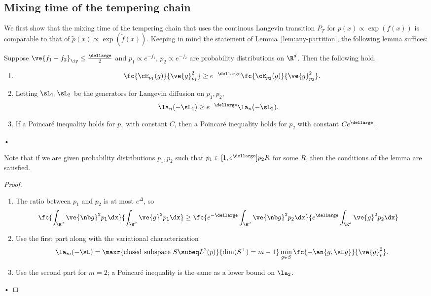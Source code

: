 \subsection{Mixing time of the tempering chain} 

We first show that the mixing time of the tempering chain that uses the continous Langevin transition $P_T$ for $p(x) \propto \exp(f(x))$ is comparable to that of $\tilde{p}(x) \propto \exp(\tilde{f}(x))$. Keeping in mind the statement of Lemma~\ref{lem:any-partition}, the following lemma suffices:  

\begin{lem}\label{lem:poincare-liy}
Suppose $\ve{f_1-f_2}_\iy\le \frac{\dellarge}{2}$ and $p_1\propto e^{-f_1}$, $p_2\propto e^{-f_2}$ are probability distributions on $\R^d$. Then the following hold.
\begin{enumerate}
\item
\begin{align}
\fc{\cE_{p_1}(g)}{\ve{g}_{p_1}^2} \ge e^{-\dellarge} \fc{\cE_{p_2}(g)}{\ve{g}_{p_2}^2}.
\end{align}
\item
Letting $\sL_1,\sL_2$ be the generators for Langevin diffusion on $p_1,p_2$,
\begin{align}
\la_n(-\sL_1) &\ge e^{-\dellarge} \la_n(-\sL_2).
\end{align}
\item
If a Poincar\'e inequality holds for $p_1$ with constant $C$, then a Poincar\'e inequality holds for $p_2$ with constant $Ce^{\dellarge}$.
\end{enumerate}•
\end{lem}
Note that if we are given probability distributions $p_1,p_2$ such that $p_1\in [1,e^{\dellarge}]p_2R$ for some $R$, then the conditions of the lemma are satisfied.
\begin{proof}
\begin{enumerate}
\item
The ratio between $p_1$ and $p_2$ is at most $e^{\Delta}$, so 
\begin{align}
\fc{\int_{\R^d} \ve{\nb g}^2p_1\dx}{\int_{\R^d} \ve{g}^2 p_1\dx}
&\ge 
\fc{ e^{-\dellarge}\int_{\R^d} \ve{\nb g}^2p_2\dx}{e^{\dellarge}\int_{\R^d} \ve{g}^2 p_2\dx}
\end{align}
\item
Use the first part along with the variational characterization \begin{align}\la_{m}(-\sL) = \maxr{\text{closed subspace }S\subeq L^2(p)}{\dim(S^{\perp})=m-1} \min_{g\in S} \fc{-\an{g,\sL g}}{\ve{g}_p^2}.\end{align}
\item
Use the second part for $m=2$; a Poincar\'e inequality is the same as a lower bound on $\la_2$.
\end{enumerate}•

\end{proof}

